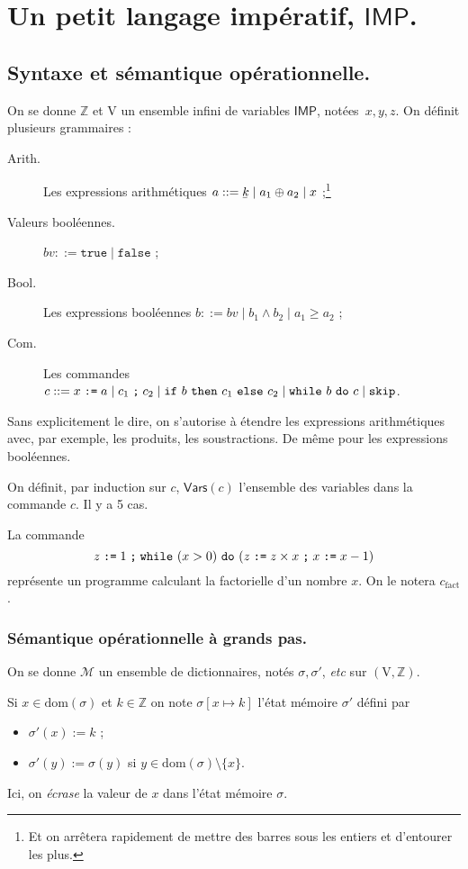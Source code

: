 \documentclass[../main]{subfiles}
\begin{document}
  \chapter{Un petit langage impératif, $\mathsf{IMP}$.}
  \minitoc

  \section{Syntaxe et sémantique opérationnelle.}
  On se donne $\mathds{Z}$ et $\mathrm{V}$ un ensemble infini de variables $\mathsf{IMP}$, notées~$x, y, z$.
  On définit plusieurs grammaires :

  \begin{description}
    \item[Arith.] Les expressions arithmétiques $a ::= \ubar{k}  \mid a_1 \oplus a_2  \mid x$ ;\footnote{Et on arrêtera rapidement de mettre des barres sous les entiers et d'entourer les plus.}\showfootnote
    \item[Valeurs booléennes.] $bv ::= \mathtt{true}  \mid \mathtt{false}$ ;
    \item[Bool.] Les expressions booléennes $b ::= bv  \mid b_1 \land b_2  \mid a_1 \ge a_2$ ;
    \item[Com.] Les commandes $c ::= x \mathrel{\texttt{:=}} a  \mid c_1 \mathrel{\texttt{;}} c_2  \mid \texttt{if}\ b\ \texttt{then}\ c_1\ \texttt{else}\ c_2  \mid \texttt{while}\ b\ \texttt{do}\ c  \mid \texttt{skip}$.
  \end{description}

  Sans explicitement le dire, on s'autorise à étendre les expressions arithmétiques avec, par exemple, les produits, les soustractions.
  De même pour les expressions booléennes.

  On définit, par induction sur $c$, $\mathsf{Vars}(c)$ l'ensemble des variables dans la commande $c$. Il y a 5 cas.

  \begin{exm}
    La commande \[
      z \mathrel{\texttt{:=}} 1 \mathrel{\texttt{;}} \texttt{while}\ (x > 0)\ \texttt{do}\ (z \mathrel{\texttt{:=}} z \times x \mathrel{\texttt{;}} x \mathrel{\texttt{:=}} x - 1)
    \]
    représente un programme calculant la factorielle d'un nombre $x$.
    On le notera $c_\text{fact}$.
  \end{exm}

  \subsection{Sémantique opérationnelle à grands pas.}

  \begin{defn}
    On se donne $\mathcal{M}$ un ensemble de dictionnaires, notés $\sigma, \sigma'$, \textit{etc} sur $(\mathrm{V}, \mathds{Z})$.

    Si $x \in \mathrm{dom}(\sigma)$ et $k \in \mathds{Z}$ on note $\sigma [x \mapsto k]$ l'état mémoire $\sigma'$ défini par 
     \begin{itemize}
      \item $\sigma'(x) := k$ ;
      \item  $\sigma'(y) := \sigma(y)$ si  $y \in \mathrm{dom}(\sigma) \setminus \{x\}$.
    \end{itemize}

    Ici, on \textit{écrase} la valeur de $x$ dans l'état mémoire $\sigma$.
  \end{defn}
\end{document}
